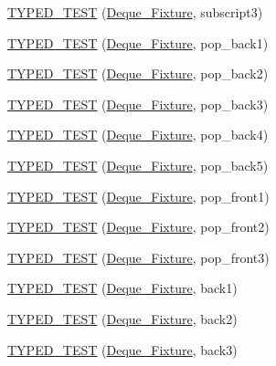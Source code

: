 \begin{DoxyCompactItemize}
\item 
\hyperlink{TestDeque_8c_09_09_a3af7a806be711791d3ad731407132330}{T\-Y\-P\-E\-D\-\_\-\-T\-E\-S\-T} (\hyperlink{structDeque__Fixture}{Deque\-\_\-\-Fixture}, subscript3)
\item 
\hyperlink{TestDeque_8c_09_09_a6c922f317d5643a792e426fb31e194b8}{T\-Y\-P\-E\-D\-\_\-\-T\-E\-S\-T} (\hyperlink{structDeque__Fixture}{Deque\-\_\-\-Fixture}, pop\-\_\-back1)
\item 
\hyperlink{TestDeque_8c_09_09_aafbac799df8a2cd5094918a04a17fd0a}{T\-Y\-P\-E\-D\-\_\-\-T\-E\-S\-T} (\hyperlink{structDeque__Fixture}{Deque\-\_\-\-Fixture}, pop\-\_\-back2)
\item 
\hyperlink{TestDeque_8c_09_09_af18daedad20e200dfe5c69ef95e23128}{T\-Y\-P\-E\-D\-\_\-\-T\-E\-S\-T} (\hyperlink{structDeque__Fixture}{Deque\-\_\-\-Fixture}, pop\-\_\-back3)
\item 
\hyperlink{TestDeque_8c_09_09_ad8dfd25f1d8b2d0ab81c4f32c2818906}{T\-Y\-P\-E\-D\-\_\-\-T\-E\-S\-T} (\hyperlink{structDeque__Fixture}{Deque\-\_\-\-Fixture}, pop\-\_\-back4)
\item 
\hyperlink{TestDeque_8c_09_09_a0e3fc12d3d521308fc163eeb9ea024f9}{T\-Y\-P\-E\-D\-\_\-\-T\-E\-S\-T} (\hyperlink{structDeque__Fixture}{Deque\-\_\-\-Fixture}, pop\-\_\-back5)
\item 
\hyperlink{TestDeque_8c_09_09_a1a4c71d68523f7b50fb1af25be06e187}{T\-Y\-P\-E\-D\-\_\-\-T\-E\-S\-T} (\hyperlink{structDeque__Fixture}{Deque\-\_\-\-Fixture}, pop\-\_\-front1)
\item 
\hyperlink{TestDeque_8c_09_09_a542b768ad041411b3b19e119b9916bb0}{T\-Y\-P\-E\-D\-\_\-\-T\-E\-S\-T} (\hyperlink{structDeque__Fixture}{Deque\-\_\-\-Fixture}, pop\-\_\-front2)
\item 
\hyperlink{TestDeque_8c_09_09_a41a27ceba46d7eb4976c8f61476944ff}{T\-Y\-P\-E\-D\-\_\-\-T\-E\-S\-T} (\hyperlink{structDeque__Fixture}{Deque\-\_\-\-Fixture}, pop\-\_\-front3)
\item 
\hyperlink{TestDeque_8c_09_09_a9d4e3d253b263a333de110423330a0b9}{T\-Y\-P\-E\-D\-\_\-\-T\-E\-S\-T} (\hyperlink{structDeque__Fixture}{Deque\-\_\-\-Fixture}, back1)
\item 
\hyperlink{TestDeque_8c_09_09_aab135fe27aaf97bfad07c42eabd8dcf1}{T\-Y\-P\-E\-D\-\_\-\-T\-E\-S\-T} (\hyperlink{structDeque__Fixture}{Deque\-\_\-\-Fixture}, back2)
\item 
\hyperlink{TestDeque_8c_09_09_a95fbfa5886394fc18276c276ca9baa6e}{T\-Y\-P\-E\-D\-\_\-\-T\-E\-S\-T} (\hyperlink{structDeque__Fixture}{Deque\-\_\-\-Fixture}, back3)
\item 

\end{DoxyCompactItemize}
